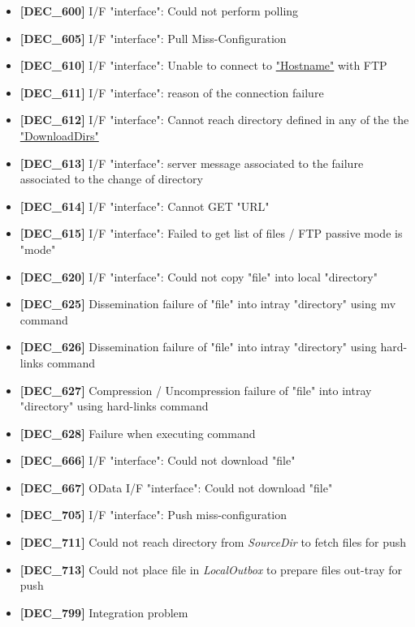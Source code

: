 \documentclass[dec_sum_main.tex]{subfiles}
\begin{document}
\begin{itemize}
	\item \textbf{[DEC\_600]} I/F "interface": Could not perform polling
	\item \textbf{[DEC\_605]} I/F "interface": Pull Miss-Configuration
	\item \textbf{[DEC\_610]} I/F "interface": Unable to connect to \hyperref[Config_Server]{"Hostname"} with FTP
	\item \textbf{[DEC\_611]} I/F "interface": reason of the connection failure
	\item \textbf{[DEC\_612]} I/F "interface": Cannot reach directory defined in any of the the \hyperref[DownloadDirs]{"DownloadDirs"}
	\item \textbf{[DEC\_613]} I/F "interface": server message associated to the failure associated to the change of directory
	\item \textbf{[DEC\_614]} I/F "interface": Cannot GET "URL"
	\item \textbf{[DEC\_615]} I/F "interface": Failed to get list of files / FTP passive mode is "mode"
	\item \textbf{[DEC\_620]} I/F "interface": Could not copy "file" into local
"directory"
	\item \textbf{[DEC\_625]} Dissemination failure of "file" into intray
"directory" using mv command
	\item \textbf{[DEC\_626]} Dissemination failure of "file" into intray
"directory" using hard-links command
	\item \textbf{[DEC\_627]} Compression / Uncompression failure of "file" into intray
"directory" using hard-links command
	\item \textbf{[DEC\_628]} Failure when executing command
	\item \textbf{[DEC\_666]} I/F "interface": Could not download "file"
	\item \textbf{[DEC\_667]} OData I/F "interface": Could not download "file"
	\item \textbf{[DEC\_705]} I/F "interface": Push miss-configuration
	\item \textbf{[DEC\_711]} Could not reach directory from \textit{SourceDir} to fetch files for push
	\item \textbf{[DEC\_713]} Could not place file in  \textit{LocalOutbox} to prepare files out-tray for push	
	\item \textbf{[DEC\_799]} Integration problem
\end{itemize}
\end{document}
